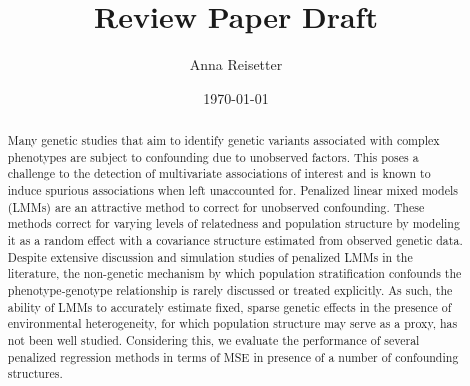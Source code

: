 \documentclass[a4paper]{article}
\title{Review Paper Draft}
\author{Anna Reisetter}
\date{\today}
\begin{document}
\maketitle

\begin{abstract}
Many genetic studies that aim to identify genetic variants associated with complex phenotypes are subject to confounding due to unobserved factors. This poses a challenge to the detection of multivariate associations of interest and is known to induce spurious associations when left unaccounted for. Penalized linear mixed models (LMMs) are an attractive method to correct for unobserved confounding. These methods correct for varying levels of relatedness and population structure by modeling it as a random effect with a covariance structure estimated from observed genetic data. Despite extensive discussion and simulation studies of penalized LMMs in the literature, the non-genetic mechanism by which population stratification confounds the phenotype-genotype relationship is rarely discussed or treated explicitly. As such, the ability of LMMs to accurately estimate fixed, sparse genetic effects in the presence of environmental heterogeneity, for which population structure may serve as a proxy, has not been well studied. Considering this, we evaluate the performance of several penalized regression methods in terms of MSE in presence of a number of confounding structures.
\end{abstract}



\newpage



\end{document}
